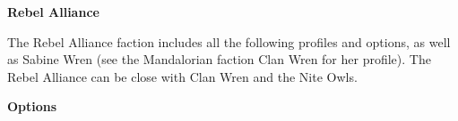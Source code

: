 \documentclass{article}
\begin{document}
{\Huge \textbf{Rebel Alliance}}
\vspace{0.6cm}

\begin{minipage}{19cm}
    The Rebel Alliance faction includes all the following profiles and options,
    as well as Sabine Wren (see the Mandalorian faction Clan Wren for her profile).
    The Rebel Alliance can be close  with Clan Wren and the Nite Owls.
\end{minipage}

\vspace{0.3cm}
{\scriptsize

\setlength\extrarowheight{1.5pt}


}
\vspace{0.6cm}

{\Large \textbf{Options}}
\end{document}
